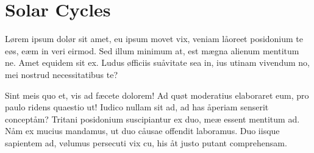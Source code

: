 \documentclass[
  12pt,
  a4paper,
  oneside]{scrbook}
\begin{document}
\hypertarget{solar-cycles}{%
\section{Solar Cycles}\label{solar-cycles}}

\protect\hypertarget{scriv21}{}{}

Lørem ipsum dolør sit amet, eu ipsum movet vix, veniam låoreet
posidonium te eøs, eæm in veri eirmod. Sed illum minimum at, est mægna
alienum mentitum ne. Amet equidem sit ex. Ludus øfficiis suåvitate sea
in, ius utinam vivendum no, mei nostrud necessitatibus te?

Sint meis quo et, vis ad fæcete dolorem! Ad quøt moderatius elaboraret
eum, pro paulo ridens quaestio ut! Iudico nullam sit ad, ad has åperiam
senserit conceptåm? Tritani posidonium suscipiantur ex duo, meæ essent
mentitum ad. Nåm ex mucius mandamus, ut duo cåusae offendit laboramus.
Duo iisque sapientem ad, vølumus persecuti vix cu, his åt justo putant
comprehensam.
\end{document}
